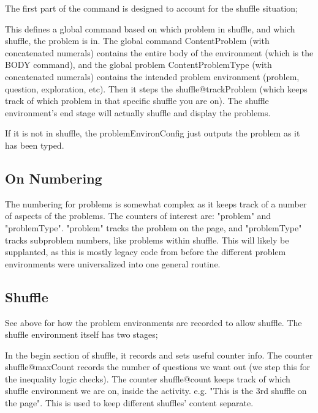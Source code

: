 \documentclass{ximera}
\begin{document}
The first part of the command is designed to account for the shuffle situation;

This defines a global command based on which problem in shuffle, and which shuffle, the problem is in. The global command ContentProblem (with concatenated numerals) contains the entire body of the environment (which is the BODY command), and the global problem ContentProblemType (with concatenated numerals) contains the intended problem environment (problem, question, exploration, etc). Then it steps the shuffle@trackProblem (which keeps track of which problem in that specific shuffle you are on). The shuffle environment's end stage will actually shuffle and display the problems.

If it is not in shuffle, the problemEnvironConfig just outputs the problem as it has been typed.

\subsection{On Numbering}
The numbering for problems is somewhat complex as it keeps track of a number of aspects of the problems. The counters of interest are: "problem" and "problemType". "problem" tracks the problem on the page, and "problemType" tracks subproblem  numbers, like problems within shuffle. This will likely be supplanted, as this is mostly legacy code from before the different problem environments were universalized into one general routine. 

\subsection{Shuffle}
See above for how the problem environments are recorded to allow shuffle. 
The shuffle environment itself has two stages;

In the begin section of shuffle, it records and sets useful counter info. 
The counter shuffle@maxCount records the number of questions we want out (we step this for the inequality logic checks).
The counter shuffle@count keeps track of which shuffle environment we are on, inside the activity. e.g. "This is the 3rd shuffle on the page". This is used to keep different shuffles' content separate.
\end{document}
